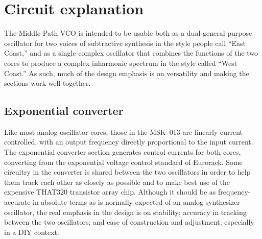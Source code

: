 
%
%
%
%
%
%

\chapter{Circuit explanation}

The Middle Path VCO is intended to be usable both as a dual general-purpose
oscillator for two voices of subtractive synthesis in the style people
call ``East Coast,'' and as a single complex oscillator that
combines the functions of the two cores to produce a complex inharmonic
spectrum in the style called ``West Coast.''  As such, much of the design
emphasis is on versatility and making the sections work well together.


\section{Exponential converter}

Like most analog oscillator cores, those in the MSK~013 are linearly
current-controlled, with an output frequency directly proportional to the
input current.  The exponential converter section generates control currents
for both cores, converting from the exponential voltage control standard of
Eurorack.  Some circuitry in the converter is shared between the two
oscillators in order to help them track each other as closely as possible
and to make best use of the expensive THAT320 transistor array chip. 
Although it should be as frequency-accurate in absolute terms as is normally
expected of an analog synthesizer oscillator, the real emphasis in the
design is on stability; accuracy in tracking between the two oscillators;
and ease of construction and adjustment, especially in a DIY context.

